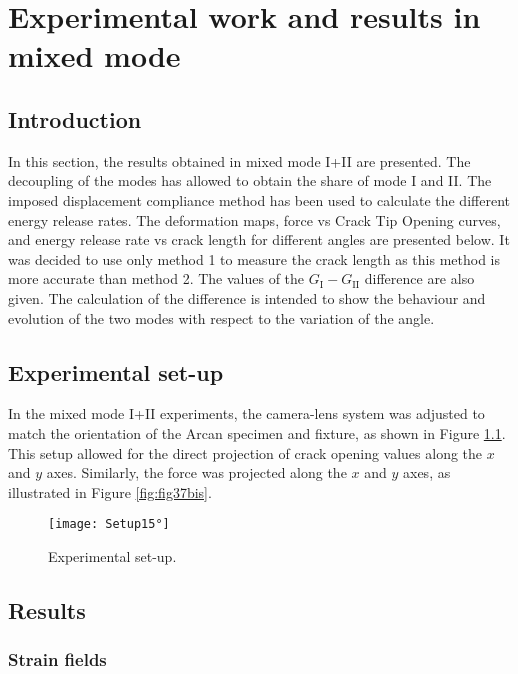 \chapter{Experimental work and results in mixed mode}
\label{Chapter2}

\section{Introduction}

In this section, the results obtained in mixed mode I+II are presented. The decoupling of the modes has allowed to obtain the share of mode I and II. The imposed displacement compliance method has been used to calculate the different energy release rates. The deformation maps, force vs Crack Tip Opening curves, and energy release rate vs crack length for different angles are presented below. It was decided to use only method 1 to measure the crack length as this method is more accurate than method 2. The values of the $G_\text{I} - G_\text{II}$ difference are also given. The calculation of the difference is intended to show the behaviour and evolution of the two modes with respect to the variation of the angle.

\section{Experimental set-up}

In the mixed mode I+II experiments, the camera-lens system was adjusted to match the orientation of the Arcan specimen and fixture, as shown in Figure \ref{fig:Setup15°}. This setup allowed for the direct projection of crack opening values along the $x$ and $y$ axes. Similarly, the force was projected along the $x$ and $y$ axes, as illustrated in Figure \ref{fig:fig37bis}.

\begin{figure}[htp]
	\centering
	\texttt{[image: Setup15°]}
	\caption{Experimental set-up.}
	\label{fig:Setup15°}
\end{figure}

\section{Results}

\subsection{Strain fields}

